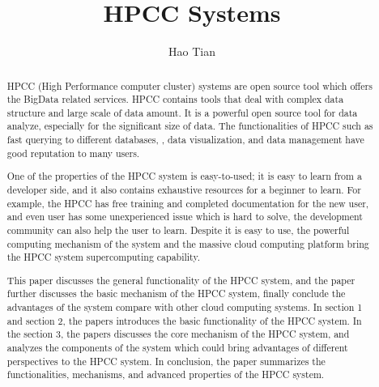 
\title{HPCC Systems}

\author{Hao Tian}


\renewcommand{\shortauthors}{H. Tian.}


\begin{abstract}

HPCC (High Performance computer cluster) systems are open source tool which offers the BigData related services. HPCC contains tools that deal with complex data structure and large scale of data amount. It is a powerful open source tool for data analyze, especially for the significant size of data. The functionalities of HPCC such as fast querying to different databases, , data visualization, and data management have good reputation to many users.

One of the properties of the HPCC system is easy-to-used; it is easy to learn from a developer side, and it also contains exhaustive resources for a beginner to learn. For example, the HPCC has free training and completed documentation for the new user, and even user has some unexperienced issue which is hard to solve, the development community can also help the user to learn. Despite it is easy to use, the powerful computing mechanism of the system and the massive cloud computing platform bring the HPCC system supercomputing capability.

This paper discusses the general functionality of the HPCC system, and the paper further discusses the basic mechanism of the HPCC system, finally conclude the advantages of the system compare with other cloud computing systems. In section 1 and section 2, the papers introduces the basic functionality of the HPCC system. In the section 3, the papers discusses the core mechanism of the HPCC system, and analyzes the components of the system which could bring advantages of different perspectives to the HPCC system. In conclusion, the paper summarizes the functionalities, mechanisms, and advanced properties of the HPCC system.
\end{abstract}


\maketitle


